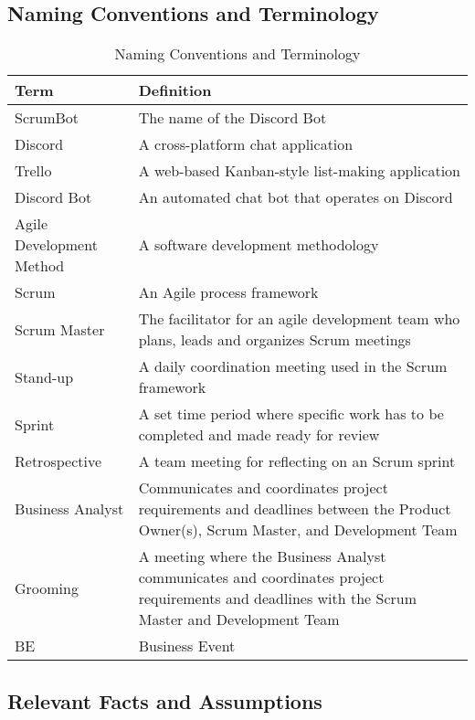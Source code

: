 \documentclass[12pt, titlepage]{article}
\begin{document}
\subsection{Naming Conventions and Terminology}
\begin{table}[H]
    \caption{Naming Conventions and Terminology}
    \centering
    \begin{tabular}{ |p{5cm}|p{10.5cm}|  }
     \hline
     \textbf{Term} & \textbf{Definition} \\
     \hline
     ScrumBot & The name of the Discord Bot \\
     \hline
     Discord & A cross-platform chat application\\
     \hline
     Trello & A web-based Kanban-style list-making application\\
     \hline
     Discord Bot & An automated chat bot that operates on Discord\\
     \hline
     Agile Development Method & A software development methodology\\
     \hline
     Scrum & An Agile process framework\\
     \hline
     Scrum Master & The facilitator for an agile development team who plans, leads and organizes Scrum meetings\\
     \hline
     Stand-up & A daily coordination meeting used in the Scrum framework\\
     \hline
     Sprint & A set time period where specific work has to be completed and made ready for review\\
     \hline
     Retrospective & A team meeting for reflecting on an Scrum sprint\\
     \hline
     Business Analyst & Communicates and coordinates project requirements and deadlines between the Product Owner(s), Scrum Master, and Development Team\\
     \hline
     Grooming & A meeting where the Business Analyst communicates and coordinates project requirements and deadlines with the Scrum Master and Development Team\\
     \hline
     BE & Business Event\\
     \hline
    \end{tabular}
\end{table}

\FloatBarrier

\subsection{Relevant Facts and Assumptions}
\end{document}
